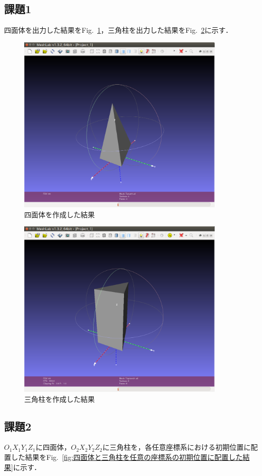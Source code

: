 \documentclass[a4paper,10pt]{jsarticle}
\begin{document}
\subsection{課題1}
四面体を出力した結果をFig.~\ref{fig:四面体を作成した結果}，三角柱を出力した結果をFig.~\ref{fig:三角柱を作成した結果}に示す．
\begin{figure}[b]
  \centering
  \includegraphics[width=100mm, bb = 0 0 1108 960]{fig/png/Tetra01.png}
  \caption{四面体を作成した結果}
  \label{fig:四面体を作成した結果}
\end{figure}

\begin{figure}[t]
  \centering
  \includegraphics[width=100mm, bb = 0 0 1111 964]{fig/png/Triprism01.png}
  \caption{三角柱を作成した結果}
  \label{fig:三角柱を作成した結果}
\end{figure}

\subsection{課題2}
$O_1X_1Y_1Z_1$に四面体，$O_2X_2Y_2Z_2$に三角柱を，各任意座標系における初期位置に配置した結果をFig.~\ref{fig:四面体と三角柱を任意の座標系の初期位置に配置した結果}に示す．
\end{document}
